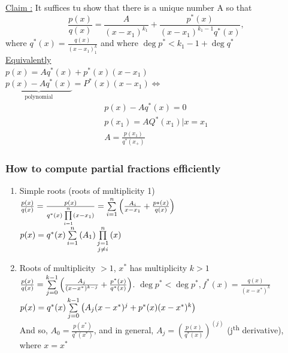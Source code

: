 \documentclass[12pt,a4paper]{article}
\begin{document}
 \underline{Claim :} It suffices tu show that there is a unique number A so that 
\begin{equation}
	\frac{p(x)}{q(x)} = \frac{A}{(x-x_1)^{k_1}} + \frac{p^*(x)}{(x-x_1)^{k_1-1}q^*(x)},
\end{equation}	
where $q^*(x) = \frac{q(x)}{(x-x_1)^k_1}$ and where $\deg p^* < k_1-1 + \deg q^*$\\
\underline{Equivalently} \\
$p(x) = Aq^*(x) + p^*(x)(x-x_1)$\\
$\underbrace{p(x) - Aq^*(x)}_{\text{polynomial}} = P^*(x)(x-x_1) \iff$ \begin{align*}
p(x) - Aq^*(x) = 0\\
p(x_1) = AQ^*(x_1) | x=x_1\\
A = \frac{p(x_1)}{q^*(x_+)}
\end{align*}

\subsubsection{How to compute partial fractions efficiently}
\begin{enumerate}
	\item Simple roots (roots of multiplicity 1)\\
	$\frac{p(x)}{q(x)} = \frac{p(x)}{q^*(x)\produit{n}{i=1}{x-x_1}} = \somme{n}{i=1}{\frac{A_i}{x-x_1} + \frac{p*(x)}{q(x)}}$\\
	$p(x) = q^*(x)\somme{n}{i=1}{A_1}\produit{n}{\substack{j=1\\j\neq i}}{x}$
	\item Roots of multiplicity $> 1$, $x^*$ has multiplicity $k > 1$\\
	 $\frac{p(x)}{q(x)} = \somme{k-1}{j=0}{\frac{A_j}{(x-x^*)^{k-j}} + \frac{p^*(x)}{q^*(x)}}$. $\deg p^* < \deg p^*, f^*(x) = \frac{q(x)}{(x-x^*)^k}$\\
	 $p(x) = q^*(x)\somme{k-1}{j=0}{A_j(x-x^*)^j + p^*(x)(x-x^*)^k}$\\
	 And so, $A_0 = \frac{p(x^*)}{q^*(x^*)}$, and in general, $A_j = \left(\frac{p(x)}{q^*(x)}\right)^(j)$ (j\textsuperscript{th} derivative), where $x= x^*$
\end{enumerate}
\end{document}
